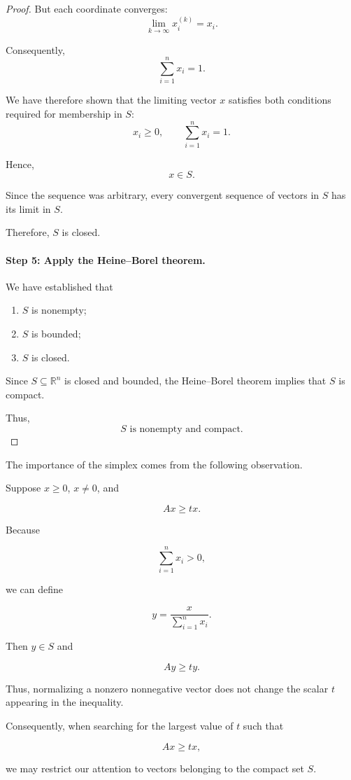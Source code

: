 \documentclass[11pt,a4paper]{article}
\theoremstyle{definition}
\theoremstyle{remark}
\begin{document}
\begin{proof}
But each coordinate converges:
\[
\lim_{k\to\infty}x_i^{(k)}=x_i.
\]

Consequently,
\[
\boxed{
\sum_{i=1}^{n}x_i=1.
}
\]

We have therefore shown that
the limiting vector $x$
satisfies both conditions
required for membership in $S$:
\[
x_i\geq0,
\qquad
\sum_{i=1}^{n}x_i=1.
\]

Hence,
\[
x\in S.
\]

Since the sequence was arbitrary,
every convergent sequence of
vectors in $S$ has its limit in $S$.

Therefore, $S$ is closed.


\paragraph{Step 5: Apply the Heine--Borel theorem.}

We have established that

\begin{enumerate}
    \item $S$ is nonempty;
    \item $S$ is bounded;
    \item $S$ is closed.
\end{enumerate}

Since $S\subseteq\mathbb{R}^n$
is closed and bounded,
the Heine--Borel theorem implies
that $S$ is compact.

Thus,
\[
\boxed{S\text{ is nonempty and compact}.}
\]

\end{proof}
The importance of the simplex
comes from the following observation.

Suppose $x\geq0$, $x\neq0$, and

\[
Ax\geq tx.
\]

Because

\[
\sum_{i=1}^{n}x_i>0,
\]

we can define

\[
y=
\frac{x}{\sum_{i=1}^{n}x_i}.
\]

Then $y\in S$ and

\[
Ay\geq ty.
\]

Thus, normalizing a nonzero
nonnegative vector does not
change the scalar $t$
appearing in the inequality.

Consequently, when searching
for the largest value of $t$
such that

\[
Ax\geq tx,
\]

we may restrict our attention
to vectors belonging to
the compact set $S$.
\end{document}
